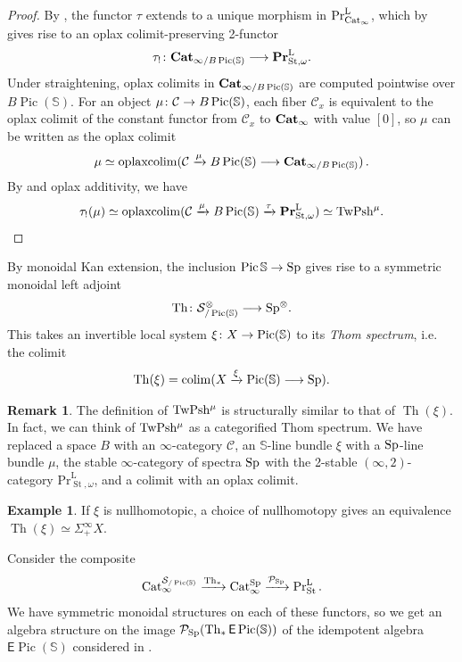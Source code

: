 \documentclass[10pt]{amsart}
\numberwithin{equation}{section}
\theoremstyle{definition}
\newtheorem{ex}[prop]{Example}
\newtheorem{rem}[prop]{Remark}
\DeclareMathOperator{\Pic}{Pic}
\DeclareMathOperator{\Th}{Th}
\DeclareMathOperator{\St}{St}
\DeclareMathOperator*{\colim}{colim}
\DeclareMathOperator*{\oplaxcolim}{oplaxcolim}
\renewcommand{\Pr}{\mathrm{Pr}}
\newcommand{\bfPr}{\mathbf{Pr}}
\newcommand{\rL}{\mathrm{L}}
\newcommand{\PrLSt}{\Pr^{\rL}_{\St}}
\newcommand{\TwShv}{\mathrm{TwPsh}\vphantom{h}}
\newcommand{\Cat}{\mathrm{Cat}\vphantom{t}}
\newcommand{\bfCat}{\mathbf{Cat}\vphantom{t}}
\newcommand{\bS}{\mathbb{S}}
\newcommand{\cC}{\mathcal{C}}
\newcommand{\cP}{\mathcal{P}}
\newcommand{\cS}{\mathcal{S}}
\newcommand{\sfE}{\mathsf{E}}
\newcommand{\Sp}{\mathrm{Sp}\vphantom{p}}
\renewcommand{\to}{\mathchoice{\longrightarrow}{\rightarrow}{}{}}
\begin{document}
\begin{proof}
	By , the functor $\tau$ extends to a unique morphism in $\Pr^{\rL}_{\Cat_{\infty}}$, which by  gives rise to an oplax colimit-preserving 2-functor
	\begin{align*}
		\tau_{!} \colon \bfCat_{\infty / B\Pic(\bS)} \to \bfPr^{\rL}_{\St, \omega}.
	\end{align*}
	Under straightening, oplax colimits in $\bfCat_{\infty/B\Pic(\bS)}$ are computed pointwise over $B\Pic(\bS)$.
  For an object $\mu \colon \cC \to B\Pic(\bS)$, each fiber $\cC_{x}$ is equivalent to the oplax colimit of the constant functor from $\cC_{x}$ to $\bfCat_{\infty}$ with value $[0]$, so $\mu$ can be written as the oplax colimit
	\begin{align*}
		\mu\simeq \oplaxcolim(\cC\xrightarrow{ \mu} B\Pic(\bS) \to \bfCat_{\infty /B\Pic(\bS)}) \,.
	\end{align*}
    By  and oplax additivity, we have
	\begin{align*}
		\tau_{!}(\mu) \simeq \oplaxcolim(\cC \xrightarrow{\mu} B\Pic(\bS) \xrightarrow{\tau} \bfPr^{\rL}_{\St, \omega}  ) \simeq \TwShv^{\mu}.
	\end{align*}
\end{proof}
By monoidal Kan extension, the inclusion $\Pic{\bS} \to \Sp$ gives rise to a symmetric monoidal left adjoint
\begin{align*}
	\Th\colon \cS_{/\Pic(\bS)}^{\otimes} \to \Sp^{\otimes}.
\end{align*}
This takes an invertible local system $\xi\colon X\to \Pic(\bS)$ to its \emph{Thom spectrum}, i.e. the colimit
\begin{align*}
	\Th(\xi) = \colim(X\xrightarrow{\xi} \Pic(\bS) \to \Sp).
\end{align*}
\begin{rem}
	The definition of $\TwShv^{\mu}$ is structurally similar to that of $\Th(\xi)$.
  In fact, we  can think of $\TwShv^{\mu}$ as a categorified Thom spectrum.
  We have replaced a space $B$ with an $\infty$-category $\cC$, an $\bS$-line bundle $\xi$ with a $\Sp$-line bundle $\mu$, the stable $\infty$-category of spectra $\Sp$ with the 2-stable $(\infty,2)$-category $\Pr^{\rL}_{\St,\omega}$, and a colimit with an oplax colimit.
\end{rem}
\begin{ex}
	If $\xi$ is nullhomotopic, a choice of nullhomotopy gives an equivalence $\Th(\xi) \simeq \Sigma^{\infty}_{+} X$.
\end{ex}
Consider the composite
\begin{align*}
	\Cat_{\infty}^{\cS_{/\Pic(\bS)}} \xrightarrow{\Th_{*}} \Cat_{\infty}^{\Sp} \xrightarrow{\cP_{\Sp}} \PrLSt \,.
\end{align*}
We have symmetric monoidal structures on each of these functors, so we get an algebra structure on the image $\cP_{\Sp}(\Th_{*} \sfE \Pic(\bS) )$ of the idempotent algebra $\sfE \Pic(\bS)$ considered in .
\end{document}
